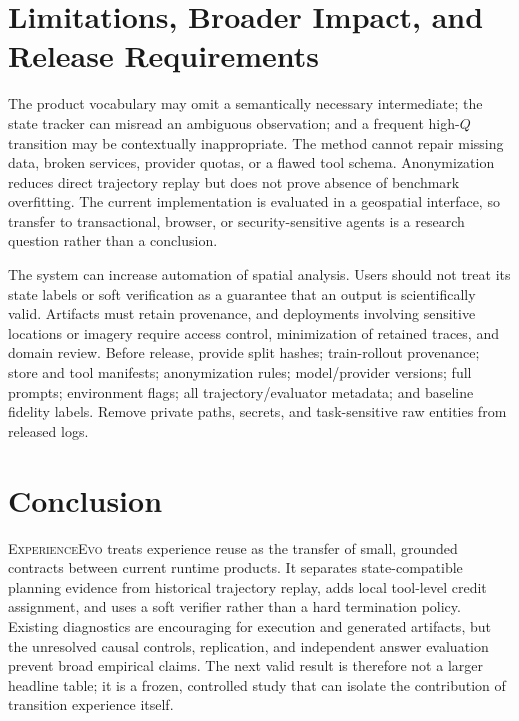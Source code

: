 \documentclass[10pt]{article}
\newcommand{\method}{\textsc{ExperienceEvo}}
\begin{document}
\section{Limitations, Broader Impact, and Release Requirements}
The product vocabulary may omit a semantically necessary intermediate; the state tracker can misread an ambiguous observation; and a frequent high-$Q$ transition may be contextually inappropriate. The method cannot repair missing data, broken services, provider quotas, or a flawed tool schema. Anonymization reduces direct trajectory replay but does not prove absence of benchmark overfitting. The current implementation is evaluated in a geospatial interface, so transfer to transactional, browser, or security-sensitive agents is a research question rather than a conclusion.

The system can increase automation of spatial analysis. Users should not treat its state labels or soft verification as a guarantee that an output is scientifically valid. Artifacts must retain provenance, and deployments involving sensitive locations or imagery require access control, minimization of retained traces, and domain review. Before release, provide split hashes; train-rollout provenance; store and tool manifests; anonymization rules; model/provider versions; full prompts; environment flags; all trajectory/evaluator metadata; and baseline fidelity labels. Remove private paths, secrets, and task-sensitive raw entities from released logs.

\section{Conclusion}
\method{} treats experience reuse as the transfer of small, grounded contracts between current runtime products. It separates state-compatible planning evidence from historical trajectory replay, adds local tool-level credit assignment, and uses a soft verifier rather than a hard termination policy. Existing diagnostics are encouraging for execution and generated artifacts, but the unresolved causal controls, replication, and independent answer evaluation prevent broad empirical claims. The next valid result is therefore not a larger headline table; it is a frozen, controlled study that can isolate the contribution of transition experience itself.

\appendix
\end{document}
